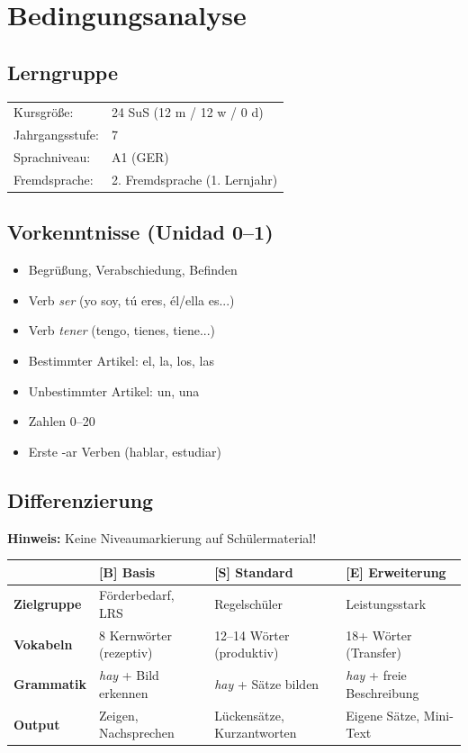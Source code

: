 \documentclass[11pt,a4paper]{article}
\newcommand{\jahrgangsstufe}{7}
\newcommand{\lerngruppengroesse}{24}
\newcommand{\maennlich}{12}
\newcommand{\weiblich}{12}
\newcommand{\divers}{0}
\newcommand{\gerniveau}{A1}
\begin{document}
\section{Bedingungsanalyse}

\subsection{Lerngruppe}
\begin{tabular}{ll}
    Kursgröße: & \lerngruppengroesse{} SuS (\maennlich{} m / \weiblich{} w / \divers{} d) \\
    Jahrgangsstufe: & \jahrgangsstufe \\
    Sprachniveau: & \gerniveau{} (GER) \\
    Fremdsprache: & 2. Fremdsprache (1. Lernjahr) \\
\end{tabular}

\subsection{Vorkenntnisse (Unidad 0--1)}
\begin{itemize}
    \item Begrüßung, Verabschiedung, Befinden
    \item Verb \textit{ser} (yo soy, tú eres, él/ella es...)
    \item Verb \textit{tener} (tengo, tienes, tiene...)
    \item Bestimmter Artikel: el, la, los, las
    \item Unbestimmter Artikel: un, una
    \item Zahlen 0--20
    \item Erste -ar Verben (hablar, estudiar)
\end{itemize}

\subsection{Differenzierung}

\textbf{Hinweis:} Keine Niveaumarkierung auf Schülermaterial!

\begin{tabular}{|l|p{3.8cm}|p{3.8cm}|p{3.8cm}|}
\hline
& \textbf{[B] Basis} & \textbf{[S] Standard} & \textbf{[E] Erweiterung} \\
\hline
\textbf{Zielgruppe} & Förderbedarf, LRS & Regelschüler & Leistungsstark \\
\hline
\textbf{Vokabeln} & 8 Kernwörter (rezeptiv) & 12--14 Wörter (produktiv) & 18+ Wörter (Transfer) \\
\hline
\textbf{Grammatik} & \textit{hay} + Bild erkennen & \textit{hay} + Sätze bilden & \textit{hay} + freie Beschreibung \\
\hline
\textbf{Output} & Zeigen, Nachsprechen & Lückensätze, Kurzantworten & Eigene Sätze, Mini-Text \\
\hline
\end{tabular}
\end{document}
